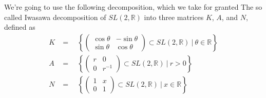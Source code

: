 \documentclass[
]{article}
\theoremstyle{break}
\theoremstyle{plain}
\begin{document}
We're going to use the following decomposition, which we take for
granted 
The so called Iwasawa decomposition of $SL(2, \mathbb{R})$ into three
matrices $K$, $A$, and $N$, defined as
\begin{align}
K & =\quad \left\{ \begin{pmatrix} \cos\theta & -\sin\theta \\ \sin\theta & \cos\theta\end{pmatrix} \subset SL(2, \mathbb{R})  \ | \ \theta \in \mathbb{R} \right\} \\
A & =\quad \left\{ \begin{pmatrix} r & 0 \\ 0 & r^{-1} \end{pmatrix} \subset SL(2, \mathbb{R})  \ | \ r > 0 \right\} \\
N & =\quad \left\{ \begin{pmatrix} 1 & x \\ 0 & 1 \end{pmatrix} \subset SL(2, \mathbb{R})  \ | \ x \in \mathbb{R} \right\}\\
\end{align}
\end{document}
